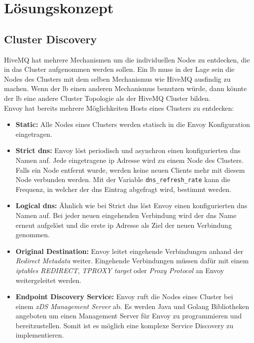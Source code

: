 \section{Lösungskonzept}

\subsection{Cluster Discovery} \label{ss:cluster-discovery}

HiveMQ hat mehrere Mechanismen um die individuellen Nodes zu entdecken, die in das Cluster aufgenommen werden sollen. Ein \ac{lb} muss in der Lage sein die Nodes des Clusters mit dem selben Mechanismus wie HiveMQ ausfindig zu machen. Wenn der \ac{lb} einen anderen Mechanismus benutzen würde, dann könnte der \ac{lb} eine andere Cluster Topologie als der HiveMQ Cluster bilden.\\
Envoy hat bereits mehrere Möglichkeiten Hosts eines Clusters zu entdecken:
\begin{itemize}
  \item \textbf{Static:} Alle Nodes eines Clusters werden statisch in die Envoy Konfiguration eingetragen.
  \item \textbf{Strict \ac{dns}:} Envoy löst periodisch und asynchron einen konfigurierten \ac{dns} Namen auf. Jede eingetragene \ac{ip} Adresse wird zu einem Node des Clusters. Falls ein Node entfernt wurde, werden keine neuen Clients mehr mit diesem Node verbunden werden. Mit der Variable \verb|dns_refresh_rate| kann die Frequenz, in welcher der \ac{dns} Eintrag abgefragt wird, bestimmt werden.
  \item \textbf{Logical \ac{dns}:} Ähnlich wie bei Strict \ac{dns} löst Envoy einen konfigurierten \ac{dns} Namen auf. Bei jeder neuen eingehenden Verbindung wird der \ac{dns} Name erneut aufgelöst und die erste \ac{ip} Adresse als Ziel der neuen Verbindung genommen.
  \item \textbf{Original Destination:} Envoy leitet eingehende Verbindungen anhand der \textit{Redirect Metadata} weiter. Eingehende Verbindungen müssen dafür mit einem \textit{iptables REDIRECT}, \textit{TPROXY target} oder \textit{Proxy Protocol} an Envoy weitergeleitet werden.
  \item \textbf{Endpoint Discovery Service:} Envoy ruft die Nodes eines Cluster bei einem \textit{xDS Management Server} ab. Es werden Java und Golang Bibliotheken angeboten um einen Management Server für Envoy zu programmieren und bereitzustellen. Somit ist es möglich eine komplexe Service Discovery zu implementieren.
\end{itemize}
